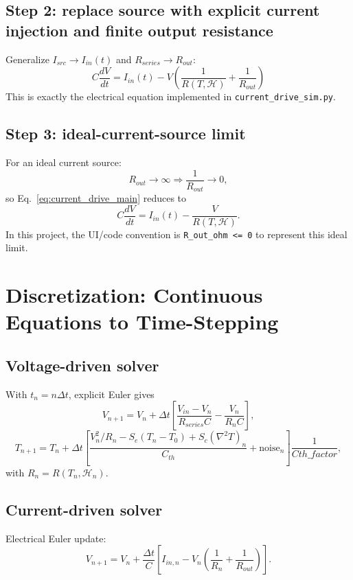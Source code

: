 \documentclass[11pt]{article}
\begin{document}
\subsection{Step 2: replace source with explicit current injection and finite output resistance}
Generalize \(I_{src}\to I_{in}(t)\) and \(R_{series}\to R_{out}\):
\begin{equation}
\boxed{
C\frac{dV}{dt}=I_{in}(t)-V\left(\frac{1}{R(T,\mathcal{H})}+\frac{1}{R_{out}}\right)
}
\label{eq:current_drive_main}
\end{equation}
This is exactly the electrical equation implemented in \texttt{current\_drive\_sim.py}.

\subsection{Step 3: ideal-current-source limit}
For an ideal current source:
\begin{equation}
R_{out}\to\infty \Rightarrow \frac{1}{R_{out}}\to 0,
\end{equation}
so Eq.~\eqref{eq:current_drive_main} reduces to
\begin{equation}
\boxed{
C\frac{dV}{dt}=I_{in}(t)-\frac{V}{R(T,\mathcal{H})}
}.
\label{eq:ideal_current_drive}
\end{equation}
In this project, the UI/code convention is \texttt{R\_out\_ohm <= 0} to represent this ideal limit.

\section{Discretization: Continuous Equations to Time-Stepping}

\subsection{Voltage-driven solver}
With \(t_n=n\Delta t\), explicit Euler gives
\begin{equation}
V_{n+1}=V_n+\Delta t\left[\frac{V_{in}-V_n}{R_{series}C}-\frac{V_n}{R_n C}\right],
\end{equation}
\begin{equation}
T_{n+1}=T_n+\Delta t\left[\frac{V_n^2/R_n-S_e(T_n-T_0)+S_c(\nabla^2T)_n}{C_{th}}+\text{noise}_n\right]\frac{1}{Cth\_factor},
\end{equation}
with \(R_n=R(T_n,\mathcal{H}_n)\).

\subsection{Current-driven solver}
Electrical Euler update:
\begin{equation}
V_{n+1}=V_n+\frac{\Delta t}{C}\left[I_{in,n}-V_n\left(\frac{1}{R_n}+\frac{1}{R_{out}}\right)\right].
\end{equation}
\end{document}
